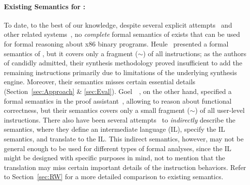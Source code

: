 \paragraph{Existing Semantics for \ISA:}
%
To date, to the best of our knowledge, despite several explicit attempts~\cite{Heule2016a,Goel:FMCAD14,Goel:ProCoS17,Goel:VTTE13:ACP:2958657.2958669} and other related systems~\cite{Leroy:2009,Remill,TSL:TOPLAS13,Hasabnis:ASPLOS16,Hasabnis:FSE16},
no \emph{complete} formal semantics of \ISA exists that can be used for formal reasoning about x86 binary programs.
%
Heule~\etal \cite{Heule2016a} presented a formal semantics of \ISA, but it covers only a fragment ($\sim$\strataPerc{}) of all instructions; as the authors of \cite{Heule2016a} candidly admitted, their synthesis methodology proved insufficient to add the remaining instructions primarily due to limitations of the underlying synthesis engine. 
%
Moreover, their semantics misses certain essential details (Section~\ref{sec:Approach} \& \ref{sec:Eval}).
%
%
Goel~\etal~\cite{Goel:FMCAD14,Goel:ProCoS17,Goel:VTTE13:ACP:2958657.2958669}, on the other hand, specified a formal semantics in the  proof assistant~\cite{ACL2:Kaufmann2000}, allowing to reason about functional correctness, but their semantics covers only a small fragment ($\sim$\goelPerc{}) of all user-level instructions.
%
There also have been several attempts~\cite{Angr1,BAP:CAV11,Radare2,Hasabnis:FSE16} to \emph{indirectly} describe the \ISA semantics, where they define an intermediate language (IL), specify the IL semantics, and translate \ISA to the IL.
This indirect semantics, however, may not be general enough to be used for different types of formal analyses, since the IL might be designed with specific purposes in mind, not to mention that the translation may miss certain important details of the instruction behaviors.
%
Refer to Section~\ref{sec:RW} for a more detailed comparison to existing semantics.

